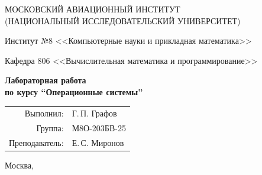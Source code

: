 \begin{titlepage}
\begin{center}
\large
МОСКОВСКИЙ АВИАЦИОННЫЙ ИНСТИТУТ\\ (НАЦИОНАЛЬНЫЙ ИССЛЕДОВАТЕЛЬСКИЙ УНИВЕРСИТЕТ)

\vspace{20pt}
Институт №8 <<Компьютерные науки и прикладная математика>>

Кафедра 806 <<Вычислительная математика и программирование>>
\end{center}
\vspace{60pt}
\begin{center}
\bfseries\large
Лабораторная работа  \\по курсу \enquote{Операционные системы}
\vspace{54pt}
\end{center}
\vfill
\begin{flushright}
\large
\begin{tabular}{rl}
Выполнил: & Г.\,П. Графов \\
Группа: & М8О-203БВ-25 \\
Преподаватель: & Е.\,С. Миронов \\
\end{tabular}
\end{flushright}
\vspace{92pt}
\begin{center}\large Москва, \the\year\end{center}
\end{titlepage}
\pagebreak
